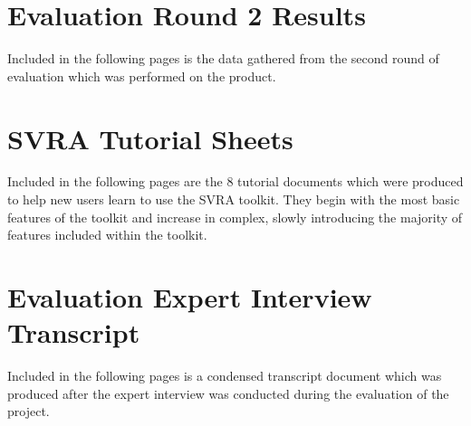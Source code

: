 \documentclass{l4proj}
\begin{document}
\begin{appendices}


\chapter{Evaluation Round 2 Results}
\label{sec:appendeval2results}
Included in the following pages is the data gathered from the second round of evaluation which was performed on the product.



\chapter{SVRA Tutorial Sheets}
\label{sec:appendtutorialsheets}
Included in the following pages are the 8 tutorial documents which were produced to help new users learn to use the SVRA toolkit. They begin with the most basic features of the toolkit and increase in complex, slowly introducing the majority of features included within the toolkit.



\chapter{Evaluation Expert Interview Transcript}
\label{sec:appendevalexperttranscript}
Included in the following pages is a condensed transcript document which was produced after the expert interview was conducted during the evaluation of the project.



\end{appendices}




\end{document}
